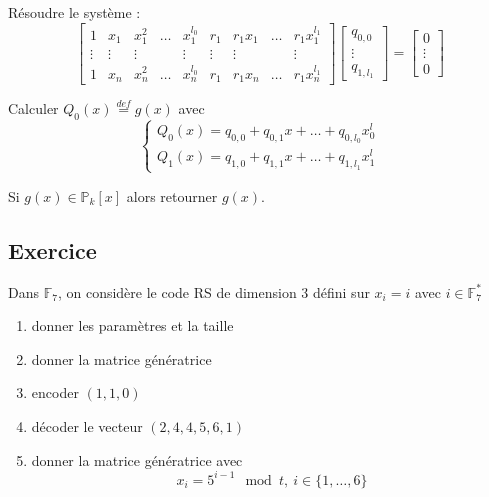 \documentclass[a4paper,10pt,twocolumn]{article}
\theoremstyle{break}
\newcommand{\F}{\mathbb{F}}
\newcommand{\Poly}{\mathbb{P}}
\begin{document}
Résoudre le système :
 $$
\begin{bmatrix}
 1 & x_1 & x_1^2 & \ldots & x_1^{l_0} & r_1 & r_1x_1 & \ldots & r_1x_1^{l_1} \\
 \vdots & \vdots & \vdots & & \vdots & \vdots & \vdots & & \vdots \\
 1 & x_n & x_n^2 & \ldots & x_n^{l_0} & r_1 & r_1x_n & \ldots & r_1x_n^{l_1}
\end{bmatrix}
\begin{bmatrix}
 q_{0,0} \\
 \vdots \\
 q_{1,l_1}
\end{bmatrix}
=
\begin{bmatrix}
 0 \\ \vdots \\ 0
\end{bmatrix}
 $$

Calculer $Q_0(x) \stackrel{def}{=} g(x)$ avec 
$$ \left \{
\begin{array}{l}
 Q_0(x) = q_{0,0} + q_{0,1}x + \ldots + q_{0,l_0}x^l_0 \\
 Q_1(x) = q_{1,0} + q_{1,1}x + \ldots + q_{1,l_1}x^l_1 
\end{array}
\right. $$

Si $g(x) \in \Poly_k[x]$ alors retourner $g(x)$.

\subsection{Exercice}
Dans $\F_7$, on considère le code RS de dimension 3 défini sur $x_i=i$ avec $i \in \F_7^*$

\begin{enumerate}
 \item donner les paramètres et la taille
 \item donner la matrice génératrice
 \item encoder $(1,1,0)$
 \item décoder le vecteur $(2,4,4,5,6,1)$
 \item donner la matrice génératrice avec 
  $$ x_i = 5^{i-1} \mod t,\ i \in \{1, \ldots, 6\} $$
\end{enumerate}
\end{document}
